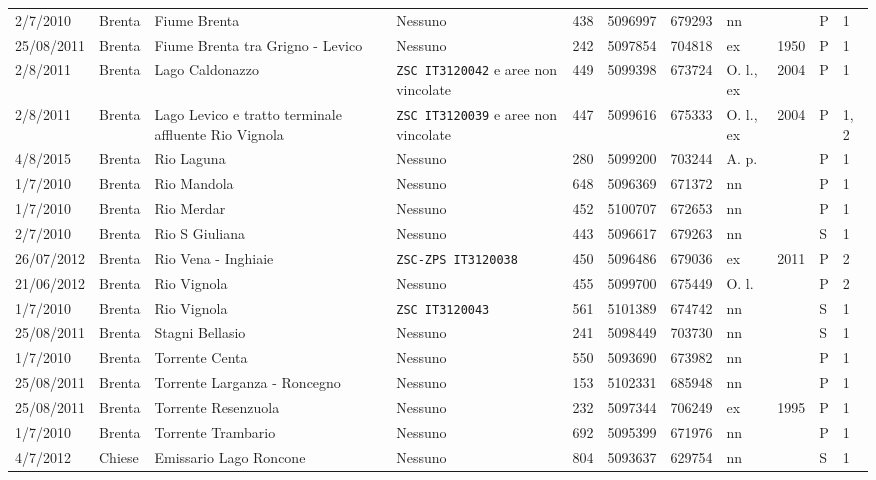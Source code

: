 \documentclass[11pt,a4paper,italian,twoside,openany]{memoir}
\begin{document}
\begin{longtable}[c]{p{}p{}p{}p{}p{}p{}p{}p{}p{}p{}l}
2/7/2010  & Brenta & Fiume Brenta   & Nessuno & 438 & 5096997  & 679293 & nn   &   & P & 1   \\
\rowcolor[HTML]{EFEFEF} 25/08/2011 & Brenta & Fiume Brenta tra Grigno - Levico & Nessuno & 242 & 5097854  & 704818 & ex   & 1950  & P & 1   \\
2/8/2011  & Brenta & Lago Caldonazzo & \texttt{ZSC IT3120042} e aree non vincolate   & 449 & 5099398  & 673724 & O. l., ex  & 2004  & P & 1   \\
\rowcolor[HTML]{EFEFEF} 2/8/2011  & Brenta & Lago Levico e tratto terminale affluente Rio Vignola & \texttt{ZSC IT3120039} e aree non vincolate   & 447 & 5099616  & 675333 & O. l., ex  & 2004  & P & 1, 2  \\
4/8/2015  & Brenta & Rio Laguna & Nessuno & 280 & 5099200  & 703244 & A. p.  &   & P & 1   \\
\rowcolor[HTML]{EFEFEF} 1/7/2010  & Brenta & Rio Mandola & Nessuno & 648 & 5096369  & 671372 & nn   &   & P & 1   \\
1/7/2010  & Brenta & Rio Merdar & Nessuno & 452 & 5100707  & 672653 & nn   &   & P & 1   \\
\rowcolor[HTML]{EFEFEF} 2/7/2010  & Brenta & Rio S Giuliana & Nessuno & 443 & 5096617  & 679263 & nn   &   & S & 1   \\
26/07/2012 & Brenta & Rio Vena - Inghiaie   & \texttt{ZSC-ZPS IT3120038}   & 450 & 5096486  & 679036 & ex   & 2011  & P & 2   \\
\rowcolor[HTML]{EFEFEF} 21/06/2012 & Brenta & Rio Vignola & Nessuno & 455 & 5099700  & 675449 & O. l.  &   & P & 2   \\
1/7/2010  & Brenta & Rio Vignola & \texttt{ZSC IT3120043} & 561 & 5101389  & 674742 & nn   &   & S & 1   \\
\rowcolor[HTML]{EFEFEF} 25/08/2011 & Brenta & Stagni Bellasio & Nessuno & 241 & 5098449  & 703730 & nn   &   & S & 1   \\
1/7/2010  & Brenta & Torrente Centa & Nessuno & 550 & 5093690  & 673982 & nn   &   & P & 1   \\
\rowcolor[HTML]{EFEFEF} 25/08/2011 & Brenta & Torrente Larganza - Roncegno   & Nessuno & 153 & 5102331  & 685948 & nn   &   & P & 1   \\
25/08/2011 & Brenta & Torrente Resenzuola   & Nessuno & 232 & 5097344  & 706249 & ex   & 1995  & P & 1   \\
\rowcolor[HTML]{EFEFEF} 1/7/2010  & Brenta & Torrente Trambario & Nessuno & 692 & 5095399  & 671976 & nn   &   & P & 1   \\
4/7/2012  & Chiese & Emissario Lago Roncone & Nessuno & 804 & 5093637  & 629754 & nn   &   & S & 1   \\

\end{longtable}
\end{document}
